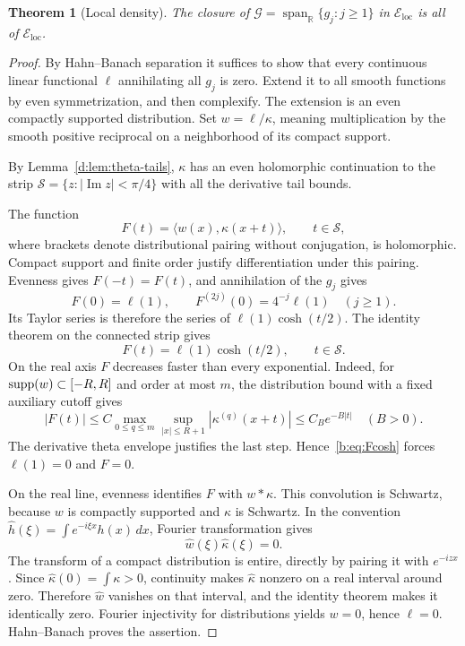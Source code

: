 \documentclass[11pt,a4paper]{article}
\numberwithin{equation}{section}
\newtheorem{theorem}{Theorem}[section]
\theoremstyle{definition}\newtheorem{definition}[theorem]{Definition}
\theoremstyle{remark}\newtheorem{remark}[theorem]{Remark}
\newcommand{\R}{\mathbb R}\newcommand{\C}{\mathbb C}\newcommand{\N}{\mathbb N}
\newcommand{\ip}[2]{\langle#1,#2\rangle}\newcommand{\norm}[1]{\lVert#1\rVert}\newcommand{\abs}[1]{\lvert#1\rvert}
\newcommand{\Eloc}{\mathcal E_{\mathrm{loc}}}\newcommand{\Def}{\mathfrak D}
\begin{document}
\begin{theorem}[Local density]\label{b:thm:density}
The closure of $\mathcal G=\operatorname{span}_{\R}\{g_j:j\ge1\}$ in $\Eloc$ is all of $\Eloc$.
\end{theorem}
\begin{proof}
By Hahn--Banach separation it suffices to show that every continuous linear functional $\ell$ annihilating all $g_j$ is zero. Extend it to all smooth functions by even symmetrization, and then complexify. The extension is an even compactly supported distribution. Set $w=\ell/\kappa$, meaning multiplication by the smooth positive reciprocal on a neighborhood of its compact support.

By Lemma~\ref{d:lem:theta-tails}, $\kappa$ has an even holomorphic continuation to the strip $\mathcal S=\{z:|\operatorname{Im}z|<\pi/4\}$ with all the derivative tail bounds.

The function
\[
 F(t)=\ip{w(x)}{\kappa(x+t)},\qquad t\in\mathcal S,
\]
where brackets denote distributional pairing without conjugation, is holomorphic. Compact support and finite order justify differentiation under this pairing. Evenness gives $F(-t)=F(t)$, and annihilation of the $g_j$ gives
\[
 F(0)=\ell(1),\qquad F^{(2j)}(0)=4^{-j}\ell(1)\quad(j\ge1).
\]
Its Taylor series is therefore the series of $\ell(1)\cosh(t/2)$. The identity theorem on the connected strip gives
\begin{equation}\label{b:eq:Fcosh}
 F(t)=\ell(1)\cosh(t/2),\qquad t\in\mathcal S.
\end{equation}
On the real axis $F$ decreases faster than every exponential. Indeed, for $\operatorname{supp}(w)\subset[-R,R]$ and order at most $m$, the distribution bound with a fixed auxiliary cutoff gives
\[
 |F(t)|\le C\max_{0\le q\le m}\sup_{|x|\le R+1}|\kappa^{(q)}(x+t)|
       \le C_Be^{-B|t|}\quad(B>0).
\]
The derivative theta envelope justifies the last step. Hence~\eqref{b:eq:Fcosh} forces $\ell(1)=0$ and $F=0$.

On the real line, evenness identifies $F$ with $w*\kappa$. This convolution is Schwartz, because $w$ is compactly supported and $\kappa$ is Schwartz. In the convention $\widehat h(\xi)=\int e^{-i\xi x}h(x)\,dx$, Fourier transformation gives
\[
 \widehat w(\xi)\widehat\kappa(\xi)=0.
\]
The transform of a compact distribution is entire, directly by pairing it with $e^{-izx}$. Since $\widehat\kappa(0)=\int\kappa>0$, continuity makes $\widehat\kappa$ nonzero on a real interval around zero. Therefore $\widehat w$ vanishes on that interval, and the identity theorem makes it identically zero. Fourier injectivity for distributions yields $w=0$, hence $\ell=0$. Hahn--Banach proves the assertion.
\end{proof}
\end{document}
